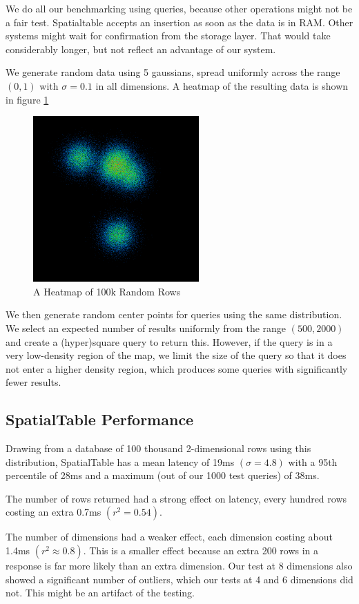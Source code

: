 \documentclass[11pt]{article}
\begin{document}
We do all our benchmarking using queries, because other operations might not be a fair test.  Spatialtable accepts an insertion as soon as the data is in RAM.  Other systems might wait for confirmation from the storage layer.  That would take considerably longer, but not reflect an advantage of our system.

We generate random data using 5 gaussians, spread uniformly across the range $(0,1)$ with $\sigma=0.1$ in all dimensions.  A heatmap of the resulting data is shown in figure \ref{fig:hm}

\begin{figure}[h!]
\centering
\includegraphics[width=2.5in]{map100k}
\caption{A Heatmap of 100k Random Rows}
\label{fig:hm}
\end{figure}

We then generate random center points for queries using the same distribution.  We select an expected number of results uniformly from the range $(500,2000)$ and create a (hyper)square query to return this.  However, if the query is in a very low-density region of the map, we limit the size of the query so that it does not enter a higher density region, which produces  some queries with significantly fewer results.

\subsection{SpatialTable Performance}

Drawing from a database of 100 thousand 2-dimensional rows using this distribution, SpatialTable has a mean latency of 19ms $(\sigma=4.8)$ with a 95th percentile of 28ms and a maximum (out of our 1000 test queries) of 38ms.

The number of rows returned had a strong effect on latency, every hundred rows costing an extra 0.7ms $(r^2=0.54)$.

The number of dimensions had a weaker effect, each dimension costing about 1.4ms $(r^2\approx 0.8)$.  This is a smaller effect because an extra 200 rows in a response is far more likely than an extra dimension.  Our test at 8 dimensions also showed a significant number of outliers, which our tests at 4 and 6 dimensions did not.   This might be an artifact of the testing.
\end{document}
